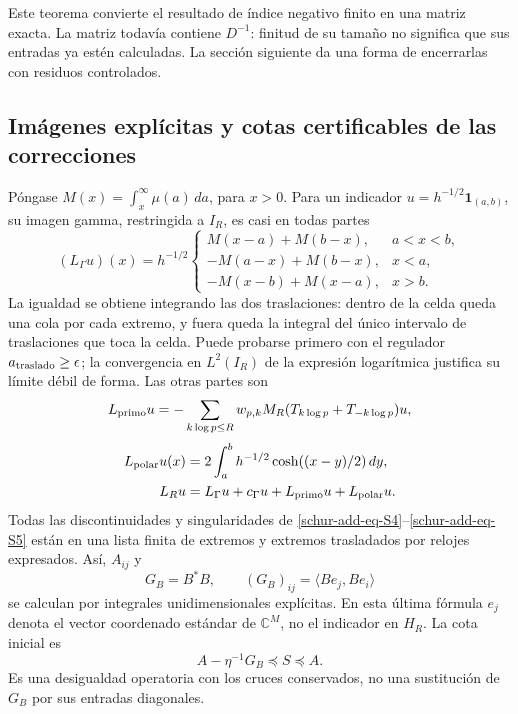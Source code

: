 Este teorema convierte el resultado de índice negativo finito en una matriz exacta. La matriz todavía contiene \(D^{-1}\): finitud de su tamaño no
significa que sus entradas ya estén calculadas. La sección siguiente
da una forma de encerrarlas con residuos controlados.

\subsection{Imágenes explícitas y cotas certificables de las correcciones}
\label{schur-add-sub-148}

Póngase \(M(x)=\int_x^\infty\mu(a)\,da\), para \(x>0\).
Para un indicador \(u=h^{-1/2}\mathbf1_{(a,b)}\), su imagen gamma,
restringida a \(I_R\), es casi en todas partes
\begin{equation}
(L_\Gamma u)(x)=h^{-1/2}
\begin{cases}
M(x-a)+M(b-x),&a<x<b,\\
-M(a-x)+M(b-x),&x<a,\\
-M(x-b)+M(x-a),&x>b.
\end{cases}
\label{schur-add-eq-S4}
\end{equation}
La igualdad se obtiene integrando las dos traslaciones: dentro de la
celda queda una cola por cada extremo, y fuera queda la integral del
único intervalo de traslaciones que toca la celda. Puede probarse primero
con el regulador \(a_{\rm traslado}\geq\epsilon\); la convergencia en
\(L^2(I_R)\) de la expresión logarítmica justifica su límite débil de
forma. Las otras partes son
\begin{equation}
L_{\rm primo}u=-\sum_{k\log p\leq R}w_{p,k}
M_R(T_{k\log p}+T_{-k\log p})u,
\label{schur-add-display-11}
\end{equation}
\begin{equation}
\begin{aligned}
L_{\rm polar}u(x)&=2\int_a^b h^{-1/2}\cosh((x-y)/2)\,dy,\\
L_Ru&=L_\Gamma u+c_\Gamma u+L_{\rm primo}u+L_{\rm polar}u.
\end{aligned}
\label{schur-add-eq-S5}
\end{equation}
Todas las discontinuidades y singularidades de \eqref{schur-add-eq-S4}--\eqref{schur-add-eq-S5} están en una
lista finita de extremos y extremos trasladados por relojes expresados.
Así, \(A_{ij}\) y
\begin{equation}
G_B=B^*B,\qquad (G_B)_{ij}=\langle Be_j,Be_i\rangle
\label{schur-add-display-13}
\end{equation}
se calculan por integrales unidimensionales explícitas. En esta última
fórmula \(e_j\) denota el vector coordenado estándar de
\(\mathbb C^M\), no el indicador en \(H_R\).
La cota inicial es
\begin{equation}
A-\eta^{-1}G_B\preceq S\preceq A.
\label{schur-add-eq-S6}
\end{equation}
Es una desigualdad operatoria con los cruces conservados, no una
sustitución de \(G_B\) por sus entradas diagonales.


